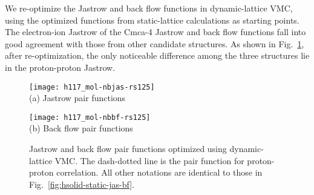 We re-optimize the Jastrow and back flow functions in dynamic-lattice VMC, using the optimized functions from static-lattice calculations as starting points.
The electron-ion Jastrow of the Cmca-4 Jastrow and back flow functions fall into good agreement with those from other candidate structures.
As shown in Fig.~\ref{fig:hsolid-dynamic-jas-bf}, after re-optimization, the only noticeable difference among the three structures lie in the proton-proton Jastrow.

\begin{figure}[h]
\centering
\begin{minipage}{0.49\textwidth}
\centering
\texttt{[image: h117\_mol-nbjas-rs125]}\\
(a) Jastrow pair functions
\end{minipage}
\begin{minipage}{0.49\textwidth}
\centering
\texttt{[image: h117\_mol-nbbf-rs125]}\\
(b) Back flow pair functions
\end{minipage}
\caption{Jastrow and back flow pair functions optimized using dynamic-lattice VMC. The dash-dotted line is the pair function for proton-proton correlation. All other notations are identical to those in Fig.~\ref{fig:hsolid-static-jas-bf}.}
\label{fig:hsolid-dynamic-jas-bf}
\end{figure}

